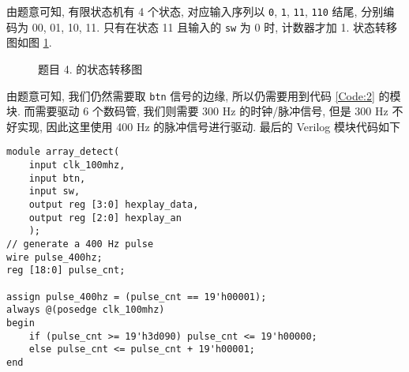 \documentclass[UTF8,fontset=fandol]{ctexart}
\begin{document}
\begin{ExQuestions}
  \question 由题意可知, 有限状态机有 4 个状态, 对应输入序列以 \texttt{0}, \texttt{1}, \texttt{11}, \texttt{110} 结尾, 分别编码为 00, 01, 10, 11. 只有在状态 11 且输入的 \texttt{sw} 为 0 时, 计数器才加 1. 状态转移图如图 \ref{fig:state_transfer:2}.
  \begin{figure}[!htbp]
    \centering
    \caption{题目 4. 的状态转移图}
    \label{fig:state_transfer:2}
  \end{figure}
  由题意可知, 我们仍然需要取 \texttt{btn} 信号的边缘, 所以仍需要用到代码 \ref{Code:2} 的模块.
  而需要驱动 6 个数码管, 我们则需要 300 Hz 的时钟/脉冲信号, 但是 300 Hz 不好实现, 因此这里使用 400 Hz 的脉冲信号进行驱动.
  最后的 Verilog 模块代码如下
  \begin{lstlisting}[style = verilogstyle, caption = {题目 4. 的 Verilog 模块}, breaklines=true]  
module array_detect(
    input clk_100mhz,
    input btn,
    input sw,
    output reg [3:0] hexplay_data,
    output reg [2:0] hexplay_an
    );
// generate a 400 Hz pulse
wire pulse_400hz;
reg [18:0] pulse_cnt;

assign pulse_400hz = (pulse_cnt == 19'h00001);
always @(posedge clk_100mhz)
begin
    if (pulse_cnt >= 19'h3d090) pulse_cnt <= 19'h00000;
    else pulse_cnt <= pulse_cnt + 19'h00001;
end


\end{lstlisting}
\end{ExQuestions}
\end{document}
